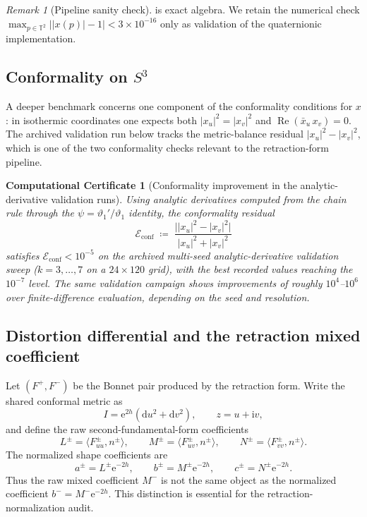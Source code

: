 \documentclass[11pt,a4paper]{article}
\theoremstyle{plain}
\newtheorem{computationalcertificate}[theorem]{Computational Certificate}
\theoremstyle{definition}
\theoremstyle{remark}
\newtheorem{remark}[theorem]{Remark}
\DeclareMathOperator{\Real}{Re}
\newcommand{\vt}[1]{\vartheta_{#1}}     %
\newcommand{\T}{\mathbb{T}}             %
\newcommand{\dd}{\mathrm{d}}
\newcommand{\ee}{\mathrm{e}}
\newcommand{\ii}{\mathrm{i}}
\newcommand{\abs}[1]{\lvert #1 \rvert}
\begin{document}
\begin{remark}[Pipeline sanity check]
\label{obs:unit-x}
   is exact algebra.  We retain the numerical check
  $\max_{p \in \T^2} \bigl|\abs{x(p)} - 1\bigr|
  < 3 \times 10^{-16}$ only as validation of the quaternionic
  implementation.
\end{remark}

\subsection{Conformality on \texorpdfstring{$S^3$}{SÃ‚Â³}}\label{sec:conformality}
A deeper benchmark concerns one component of the conformality conditions
for $x$: in isothermic coordinates one expects both
$\abs{x_u}^2 = \abs{x_v}^2$ and $\Real(\bar{x}_u\,x_v) = 0$.
The archived validation run below tracks the metric-balance residual
$\abs{x_u}^2 - \abs{x_v}^2$, which is one of the two conformality checks
relevant to the retraction-form pipeline.

\begin{computationalcertificate}[Conformality improvement in the
  analytic-derivative validation runs]
\label{cert:conformality}
Using analytic derivatives computed from the chain rule through
the $\psi = \vt{1}'/\vt{1}$ identity, the conformality residual
\[
  \mathcal{E}_{\mathrm{conf}}
  \;\coloneqq\;  \frac{\bigl|\abs{x_u}^2 - \abs{x_v}^2\bigr|}
    {\abs{x_u}^2 + \abs{x_v}^2}
\]
satisfies $\mathcal{E}_{\mathrm{conf}} < 10^{-5}$ on the archived
multi-seed analytic-derivative validation sweep ($k = 3,\ldots,7$ on a
$24 \times 120$ grid), with the best recorded values reaching the
$10^{-7}$ level.  The same validation campaign shows improvements of
roughly $10^4$--$10^6$ over finite-difference evaluation,
depending on the seed and resolution.
\end{computationalcertificate}

\subsection{Distortion differential and the retraction mixed coefficient}
\label{sec:DeltaII}

Let $(F^+,F^-)$ be the Bonnet pair produced by the retraction form.
Write the shared conformal metric as
\[
  I=\ee^{2h}(\dd u^2+\dd v^2),
  \qquad z=u+\ii v,
\]
and define the raw second-fundamental-form coefficients
\[
  L^\pm=\langle F^\pm_{uu},n^\pm\rangle,
  \qquad
  M^\pm=\langle F^\pm_{uv},n^\pm\rangle,
  \qquad
  N^\pm=\langle F^\pm_{vv},n^\pm\rangle.
\]
The normalized shape coefficients are
\[
  a^\pm=L^\pm\ee^{-2h},\qquad
  b^\pm=M^\pm\ee^{-2h},\qquad
  c^\pm=N^\pm\ee^{-2h}.
\]
Thus the raw mixed coefficient $M^-$ is not the same object as the
normalized coefficient $b^- = M^-\ee^{-2h}$.
This distinction is essential for the retraction-normalization audit.
\end{document}
